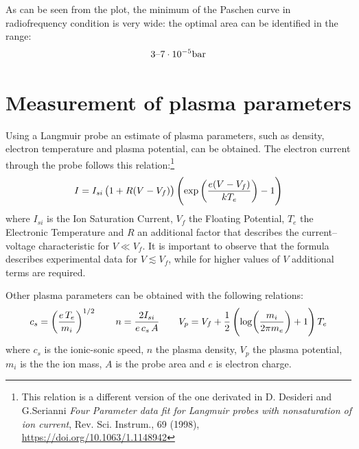 \documentclass[11pt,a4 paper]{article}
\let\oldfrac\frac
\renewcommand{\frac}[3][d]{\ifthenelse{\equal{#1}{d}}{\oldfrac{#2}{#3}}{\nicefrac{#2}{#3}}}
\begin{document}

As can be seen from the plot, the minimum of the Paschen curve in radiofrequency condition is very wide: the optimal area can be identified in the range: $$3\textup{--}7 \cdot 10^{-5}\si{\bar}$$

\section{Measurement of plasma parameters}
Using a Langmuir probe an estimate of plasma parameters, such as density, electron temperature and plasma potential, can be obtained.
The electron current through the probe follows this relation:\footnote{This relation is a different version of the one derivated in D. Desideri and G.Serianni \emph{Four Parameter data fit for Langmuir probes with nonsaturation of ion current}, Rev. Sci. Instrum., 69 (1998), \url{https://doi.org/10.1063/1.1148942}}
\[I=I_{si}\left(1+R(V-V_f)\right)\left(\exp\left(\frac{e(V-V_f)}{kT_e}\right)-1\right)\]
where $I_{si}$ is the Ion Saturation Current, $V_f$ the Floating Potential, $T_e$ the Electronic Temperature and $R$ an additional factor that describes the current--voltage characteristic for $V\ll V_f$.
It is important to observe that the formula describes experimental data for $V\lesssim V_f$, while for higher values of $V$ additional terms are required.

Other plasma parameters can be obtained with the following relations:
\begin{equation*}
  c_s=\left(\frac{e\,T_e}{m_i}\right)^{1/2} \qquad
  n=\frac{2I_{si}}{e\,c_s\,A} \qquad
  V_p=V_f+\frac12\left(\log(\frac{m_i}{2\pi m_e})+1\right) T_e
\end{equation*}
where $c_s$ is the ionic-sonic speed, $n$ the plasma density, $V_p$ the plasma potential, $m_i$ is the the ion mass, $A$ is the probe area and $e$ is electron charge.
\end{document}
